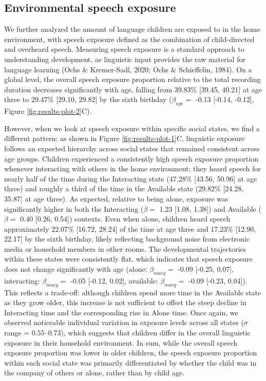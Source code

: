 \documentclass[
  english,
  12pt,
  man,floatsintext]{apa6}
\begin{document}
\subsection{Environmental speech exposure}\label{environmental-speech-exposure}

We further analyzed the amount of language children are exposed to in the home environment, with speech exposure defined as the combination of child-directed and overheard speech. Measuring speech exposure is a standard approach to understanding development, as linguistic input provides the raw material for language learning (Ochs \& Kremer-Sadl, 2020; Ochs \& Schieffelin, 1984). On a global level, the overall speech exposure proportion relative to the total recording duration decreases significantly with age, falling from 39.83\% {[}39.45, 40.21{]} at age three to 29.47\% {[}29.10, 29.82{]} by the sixth birthday (\(\beta_{age} =\) -0.13 {[}-0.14, -0.12{]}, Figure \ref{fig:results-plot-2}C).

However, when we look at speech exposure within specific social states, we find a different pattern: as shown in Figure \ref{fig:results-plot-1}C, linguistic exposure follows an expected hierarchy across social states that remained consistent across age groups. Children experienced a consistently high speech exposure proportion whenever interacting with others in the home environment; they heard speech for nearly half of the time during the Interacting state (47.28\% {[}43.56, 50.96{]} at age three) and roughly a third of the time in the Available state (29.82\% {[}24.28, 35.87{]} at age three). As expected, relative to being alone, exposure was significantly higher in both the Interacting (\(\beta =\) 1.23 {[}1.08, 1.38{]}) and Available (\(\beta =\) 0.40 {[}0.26, 0.54{]}) contexts. Even when alone, children heard speech approximately 22.07\% {[}16.72, 28.24{]} of the time at age three and 17.23\% {[}12.90, 22.17{]} by the sixth birthday, likely reflecting background noise from electronic media or household members in other rooms. The developmental trajectories within these states were consistently flat, which indicates that speech exposure does not change significantly with age (alone: \(\beta_{marg} =\) -0.09 {[}-0.25, 0.07{]}, interacting: \(\beta_{marg} =\) -0.05 {[}-0.12, 0.02{]}, available: \(\beta_{marg} =\) -0.09 {[}-0.23, 0.04{]}). This reflects a trade-off: although children spend more time in the Available state as they grow older, this increase is not sufficient to offset the steep decline in Interacting time and the corresponding rise in Alone time. Once again, we observed noticeable individual variation in exposure levels across all states (\(\sigma\) range = \(0.55 \text{--} 0.73\)), which suggests that children differ in the overall linguistic exposure in their household environment. In sum, while the overall speech exposure proportion was lower in older children, the speech exposure proportion within each social state was primarily differentiated by whether the child was in the company of others or alone, rather than by child age.
\end{document}
